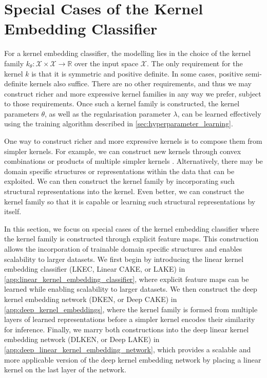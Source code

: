 \documentclass{article}
\begin{document}
		
			
\newpage
\section{Special Cases of the Kernel Embedding Classifier}
\label{app:special_cases}

	For a kernel embedding classifier, the modelling lies in the choice of the kernel family $k_{\theta} : \mathcal{X} \times \mathcal{X} \to \mathbb{R}$ over the input space $\mathcal{X}$. The only requirement for the kernel $k$ is that it is symmetric and positive definite. In some cases, positive semi-definite kernels also suffice. There are no other requirements, and thus we may construct richer and more expressive kernel families in any way we prefer, subject to those requirements. Once such a kernel family is constructed, the kernel parameters $\theta$, as well as the regularisation parameter $\lambda$, can be learned effectively using the training algorithm described in \cref{sec:hyperparameter_learning}.
	
	One way to construct richer and more expressive kernels is to compose them from simpler kernels. For example, we can construct new kernels through convex combinations or products of multiple simpler kernels \citep{genton2001classes}. Alternatively, there may be domain specific structures or representations within the data that can be exploited. We can then construct the kernel family by incorporating such structural representations into the kernel. Even better, we can construct the kernel family so that it is capable or learning such structural representations by itself.
	
	In this section, we focus on special cases of the kernel embedding classifier where the kernel family is constructed through explicit feature maps. This construction allows the incorporation of trainable domain specific structures and enables scalability to larger datasets. We first begin by introducing the linear kernel embedding classifier (LKEC, Linear CAKE, or LAKE) in \cref{app:linear_kernel_embedding_classifier}, where explicit feature maps can be learned while enabling scalability to larger datasets. We then construct the deep kernel embedding network (DKEN, or Deep CAKE) in \cref{app:deep_kernel_embeddings}, where the kernel family is formed from multiple layers of learned representations before a simpler kernel encodes their similarity for inference. Finally, we marry both constructions into the deep linear kernel embedding network (DLKEN, or Deep LAKE) in \cref{app:deep_linear_kernel_embedding_network}, which provides a scalable and more applicable version of the deep kernel embedding network by placing a linear kernel on the last layer of the network.
\end{document}
